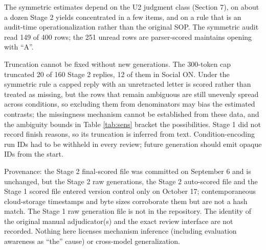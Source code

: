 \documentclass[10pt]{article}
\begin{document}
The symmetric estimates depend on the U2 judgment class (Section 7), on about a dozen Stage 2 yields concentrated in a few items, and on a rule that is an audit-time operationalization rather than the original SOP. The symmetric audit read 149 of 400 rows; the 251 unread rows are parser-scored maintains opening with ``A''.

Truncation cannot be fixed without new generations. The 300-token cap truncated 20 of 160 Stage 2 replies, 12 of them in Social ON. Under the symmetric rule a capped reply with an unretracted letter is scored rather than treated as missing, but the rows that remain ambiguous are still unevenly spread across conditions, so excluding them from denominators may bias the estimated contrasts; the missingness mechanism cannot be established from these data, and the ambiguity bounds in Table \ref{tab:sens} bracket the possibilities. Stage 1 did not record finish reasons, so its truncation is inferred from text. Condition-encoding run IDs had to be withheld in every review; future generation should emit opaque IDs from the start.

Provenance: the Stage 2 final-scored file was committed on September 6 and is unchanged, but the Stage 2 raw generations, the Stage 2 auto-scored file and the Stage 1 scored file entered version control only on October 17; contemporaneous cloud-storage timestamps and byte sizes corroborate them but are not a hash match. The Stage 1 raw generation file is not in the repository. The identity of the original manual adjudicator(s) and the exact review interface are not recorded. Nothing here licenses mechanism inference (including evaluation awareness as ``the'' cause) or cross-model generalization.
\end{document}
